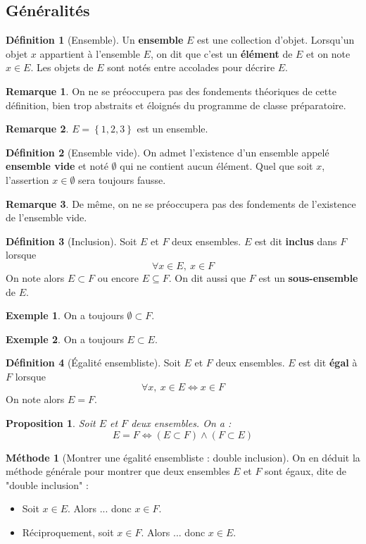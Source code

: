 \documentclass[french]{book}
\theoremstyle{plain}
\newtheorem{prop}{Proposition}[chapter]
\theoremstyle{definition}
\newtheorem{dfn}{Définition}[chapter]
\newtheorem{exa}{Exemple}[chapter]
\newtheorem{rmq}{Remarque}[chapter]
\newtheorem{met}{Méthode}[chapter]
\theoremstyle{remark}
\begin{document}
\subsection{Généralités}
\begin{dfn}[Ensemble]
	Un \textbf{ensemble} $E$ est une collection d'objet. Lorsqu'un objet $x$ appartient à l'ensemble $E$, on dit que c'est un \textbf{élément} de $E$ et on note $x\in E$. Les objets de $E$ sont notés entre accolades pour décrire $E$.
\end{dfn}
\begin{rmq}
	On ne se préoccupera pas des fondements théoriques de cette définition, bien trop abstraits et éloignés du programme de classe préparatoire.
\end{rmq}
\begin{rmq}
	$E=\left\{1,2,3\right\}$ est un ensemble.
\end{rmq}
\begin{dfn}[Ensemble vide]
	On admet l'existence d'un ensemble appelé \textbf{ensemble vide} et noté $\emptyset$ qui ne contient aucun élément. Quel que soit $x$, l'assertion $x\in\emptyset$ sera toujours fausse.
\end{dfn}
\begin{rmq}
	De même, on ne se préoccupera pas des fondements de l'existence de l'ensemble vide.
\end{rmq}
\begin{dfn}[Inclusion]
	Soit $E$ et $F$ deux ensembles. $E$ est dit \textbf{inclus} dans $F$ lorsque $$\forall x\in E,\ x\in F$$ On note alors $E\subset F$ ou encore $E\subseteq F$. On dit aussi que $F$ est un \textbf{sous-ensemble} de $E$.
\end{dfn}
\begin{exa}
	On a toujours $\emptyset\subset F$.
\end{exa}
\begin{exa}
	On a toujours $E\subset E$.
\end{exa}
\begin{dfn}[Égalité ensembliste]
	Soit $E$ et $F$ deux ensembles. $E$ est dit \textbf{égal} à $F$ lorsque $$\forall x,\ x\in E\iff x\in F$$ On note alors $E=F$. 
\end{dfn}
\begin{prop}
	Soit $E$ et $F$ deux ensembles. On a : $$E=F\iff (E\subset F)\land (F\subset E)$$
\end{prop}
\begin{met}[Montrer une égalité ensembliste : double inclusion]
	On en déduit la méthode générale pour montrer que deux ensembles $E$ et $F$ sont égaux, dite de "double inclusion" :
	\begin{itemize}
		\item Soit $x\in E$. Alors ... donc $x\in F$.
		\item Réciproquement, soit $x\in F$. Alors ... donc $x\in E$.
	\end{itemize}
\end{met}
\end{document}

